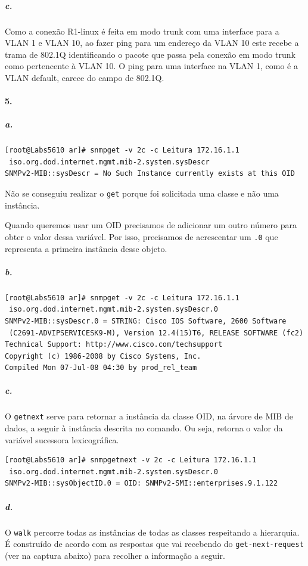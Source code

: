 \newpage

\subparagraph{c.}
Como a conexão R1-linux é feita em modo trunk com uma interface para a VLAN 1 e VLAN 10, ao fazer ping para um endereço da VLAN 10 este recebe a trama de 802.1Q identificando o pacote que passa pela conexão em modo trunk como pertencente à VLAN 10. O ping para uma interface na VLAN 1, como é a VLAN default, carece do campo de 802.1Q.


\paragraph{5.}

\subparagraph{a.}
\begin{verbatim}
[root@Labs5610 ar]# snmpget -v 2c -c Leitura 172.16.1.1
 iso.org.dod.internet.mgmt.mib-2.system.sysDescr
SNMPv2-MIB::sysDescr = No Such Instance currently exists at this OID
\end{verbatim}

Não se conseguiu realizar o \texttt{get} porque foi solicitada uma classe e não uma instância.

Quando queremos usar um OID precisamos de adicionar um outro número para obter o valor dessa variável. Por isso, precisamos de acrescentar um \texttt{.0} que representa a primeira instância desse objeto.


\subparagraph{b.}
\begin{verbatim}
[root@Labs5610 ar]# snmpget -v 2c -c Leitura 172.16.1.1
 iso.org.dod.internet.mgmt.mib-2.system.sysDescr.0
SNMPv2-MIB::sysDescr.0 = STRING: Cisco IOS Software, 2600 Software
 (C2691-ADVIPSERVICESK9-M), Version 12.4(15)T6, RELEASE SOFTWARE (fc2)
Technical Support: http://www.cisco.com/techsupport
Copyright (c) 1986-2008 by Cisco Systems, Inc.
Compiled Mon 07-Jul-08 04:30 by prod_rel_team
\end{verbatim}


\subparagraph{c.}
O \texttt{getnext} serve para retornar a instância da classe OID, na árvore de MIB de dados, a seguir à instância descrita no comando. Ou seja, retorna o valor da variável sucessora lexicográfica.


\begin{verbatim}
[root@Labs5610 ar]# snmpgetnext -v 2c -c Leitura 172.16.1.1
 iso.org.dod.internet.mgmt.mib-2.system.sysDescr.0
SNMPv2-MIB::sysObjectID.0 = OID: SNMPv2-SMI::enterprises.9.1.122
\end{verbatim}


\subparagraph{d.}
O \texttt{walk} percorre todas as instâncias de todas as classes respeitando a hierarquia. É construído de  acordo com  as  respostas  que  vai  recebendo  do  \texttt{get-next-request} (ver  na captura abaixo) para recolher a informação a seguir.

